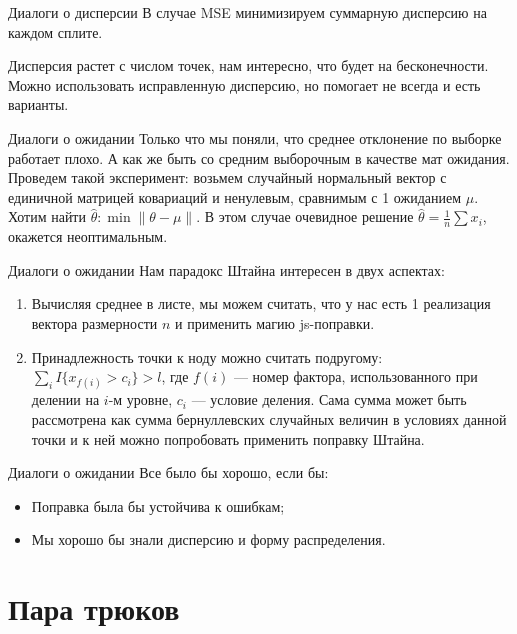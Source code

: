 \documentclass[14pt, fleqn, xcolor={dvipsnames, table}]{beamer}
\begin{document}
\begin{frame}{Диалоги о дисперсии}
В случае MSE минимизируем суммарную дисперсию на каждом сплите.

Дисперсия растет с числом точек, нам интересно, что будет на бесконечности. Можно использовать исправленную дисперсию, но помогает не всегда и есть варианты.

\end{frame}
\begin{frame}{Диалоги о ожидании} %
Только что мы поняли, что среднее отклонение по выборке работает плохо. А как же быть со средним выборочным в качестве мат ожидания. \\
Проведем такой эксперимент: возьмем случайный нормальный вектор с единичной матрицей ковариаций и ненулевым, сравнимым с 1 ожиданием $\mu$. Хотим найти $\hat{\theta}: \min \|\theta - \mu\|$. В этом случае очевидное решение $\hat{\theta} = \frac{1}{n}\sum x_i$, окажется неоптимальным. %
\end{frame}

\begin{frame}{Диалоги о ожидании} %
Нам парадокс Штайна интересен в двух аспектах:
\begin{enumerate}
  \item Вычисляя среднее в листе, мы можем считать, что у нас есть 1 реализация вектора размерности $n$ и применить магию js-поправки.
  \item Принадлежность точки к ноду можно считать подругому: $\sum_i I\{x_{f(i)} > c_i\} > l$, где $f(i)$ --- номер фактора, использованного при делении на $i$-м уровне, $c_i$ --- условие деления. Сама сумма может быть рассмотрена как сумма бернуллевских случайных величин в условиях данной точки и к ней можно попробовать применить поправку Штайна.
\end{enumerate}
\end{frame}

\begin{frame}{Диалоги о ожидании} %
Все было бы хорошо, если бы:
\begin{itemize}
  \item Поправка была бы устойчива к ошибкам; %
  \item Мы хорошо бы знали дисперсию и форму распределения.
\end{itemize}
\end{frame}


\section{Пара трюков}
\end{document}
